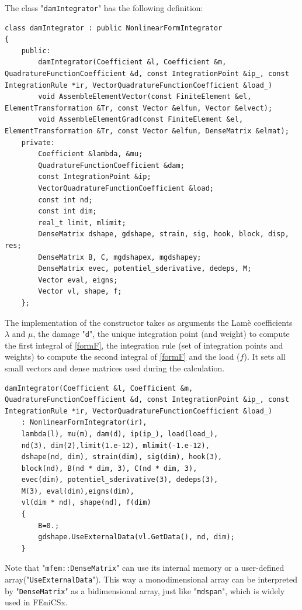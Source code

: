 \documentclass[12pt]{article}
\newcommand{\f}[1]{FEniCSx#1}
\newcommand{\mycode}[1]{\textsf{"}\lstinline`#1`\textsf{"}}
\begin{document}
The class \mycode{damIntegrator} has the following definition:
\begin{lstlisting}[basicstyle=\scriptsize,label=damIntegrator]
class damIntegrator : public NonlinearFormIntegrator
{
	public:
	    damIntegrator(Coefficient &l, Coefficient &m, QuadratureFunctionCoefficient &d, const IntegrationPoint &ip_, const IntegrationRule *ir, VectorQuadratureFunctionCoefficient &load_)
	 	void AssembleElementVector(const FiniteElement &el, ElementTransformation &Tr, const Vector &elfun, Vector &elvect);
		void AssembleElementGrad(const FiniteElement &el, ElementTransformation &Tr, const Vector &elfun, DenseMatrix &elmat);
	private:
		Coefficient &lambda, &mu;
		QuadratureFunctionCoefficient &dam;
		const IntegrationPoint &ip;
		VectorQuadratureFunctionCoefficient &load;
		const int nd;
		const int dim;
		real_t limit, mlimit;
		DenseMatrix dshape, gdshape, strain, sig, hook, block, disp, res;
		DenseMatrix B, C, mgdshapex, mgdshapey;
		DenseMatrix evec, potentiel_sderivative, dedeps, M;
		Vector eval, eigns;
		Vector vl, shape, f;
	};
\end{lstlisting}
The implementation of the constructor takes as arguments the Lamè coefficients $\lambda$ and $\mu$, the damage \mycode{d}, the unique integration point (and weight) to compute the first integral of  \eqref{formF}, the integration rule (set of integration  points and weights) to compute the second integral of  \eqref{formF} and the load ($f$).
It sets all small vectors and dense matrices used during the calculation.
\begin{lstlisting}[basicstyle=\scriptsize,label=damIntegratorconstr]
damIntegrator(Coefficient &l, Coefficient &m, QuadratureFunctionCoefficient &d, const IntegrationPoint &ip_, const IntegrationRule *ir, VectorQuadratureFunctionCoefficient &load_)
	: NonlinearFormIntegrator(ir),
	lambda(l), mu(m), dam(d), ip(ip_), load(load_),
	nd(3), dim(2),limit(1.e-12), mlimit(-1.e-12),
	dshape(nd, dim), strain(dim), sig(dim), hook(3),
	block(nd), B(nd * dim, 3), C(nd * dim, 3),
	evec(dim), potentiel_sderivative(3), dedeps(3),
	M(3), eval(dim),eigns(dim),
	vl(dim * nd), shape(nd), f(dim)
	{
		B=0.;
		gdshape.UseExternalData(vl.GetData(), nd, dim);
	}
\end{lstlisting}
Note that \mycode{mfem::DenseMatrix} can use its internal memory or a user-defined array(\mycode{UseExternalData}). This way a monodimensional array can be interpreted by \mycode{DenseMatrix} as a bidimensional array, just like \mycode{mdspan}, which is widely used in \f{}.
\end{document}
